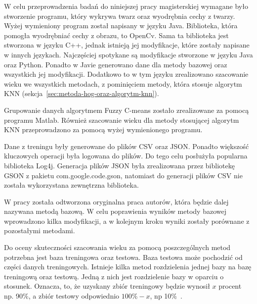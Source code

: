 \documentclass[a4paper,twoside,12pt]{book}
\begin{document}
    W celu przeprowadzenia badań do niniejszej pracy magisterskiej wymagane było stworzenie programu,
    który wykrywa twarz oraz wyodrębnia cechy z twarzy. Wyżej wymieniony program został napisany w języku Java.
    Biblioteka, która pomogła wyodrębniać cechy z obrazu, to OpenCv. Sama ta biblioteka jest stworzona w języku C++, jednak
    istnieją jej modyfikacje, które zostały napisane w innych językach. Najczęściej spotykane są modyfikacje
    stworzone w języku Java oraz Python. Ponadto w Javie generowano dane dla metody bazowej oraz wszystkich
    jej modyfikacji. Dodatkowo to w tym języku zrealizowano szacowanie wieku we wszystkich metodach, z
    pominięciem metody, która stosuje algorytm KNN (sekcja~\ref{sec:metoda-hog-oraz-algorytm-knn}).

    Grupowanie danych algorytmem Fuzzy C-means zostało zrealizowane za pomocą programu Matlab.
    Również szacowanie wieku dla metody stosującej algorytm KNN przeprowadzono za pomocą wyżej wymienionego
    programu.

    Dane z treningu były generowane do plików CSV oraz JSON. Ponadto większość kluczowych operacji była logowana do plików. Do
    tego celu posłużyła popularna biblioteka Log4j.
    Generacja plików JSON była zrealizowana przez bibliotekę GSON z pakietu com.google.code.gson, natomiast
    do generacji plików CSV nie została wykorzystana zewnętrzna biblioteka.

    W pracy została odtworzona oryginalna praca autorów, która
    będzie dalej nazywana metodą bazową.
    W celu poprawienia wyników metody bazowej wprowadzono kilka modyfikacji, a
    w kolejnym kroku wyniki zostały porównane z pozostałymi metodami.

    Do oceny skuteczności szacowania wieku za pomocą poszczególnych metod potrzebna jest baza treningowa oraz testowa.
    Baza testowa może pochodzić od części danych treningowych. Istnieje kilka metod rozdzielenia jednej bazy na bazę
    treningową oraz testową.
    Jedną z nich jest rozdzielenie bazy w oparciu o stosunek. Oznacza, to, że uzyskany zbiór treningowy będzie wynosił
    $x$ procent np. 90\%, a zbiór testowy odpowiednio $100\% -x$, np 10\%~\cite{dataMiningAlgorithms}.
\end{document}
